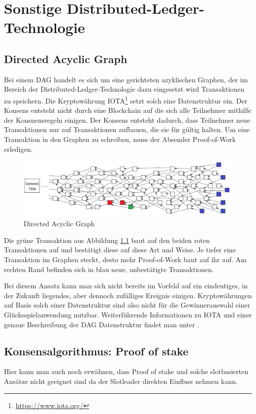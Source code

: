 \chapter{Sonstige Distributed-Ledger-Technologie}
\section{Directed Acyclic Graph}
Bei einem DAG handelt es sich um eine gerichteten azyklischen Graphen, der im Bereich der  Distributed-Ledger-Technologie dazu eingesetzt wird Transaktionen zu speichern.
Die Kryptowährung IOTA\footnote{\url{https://www.iota.org/}} setzt solch eine Datenstruktur ein. Der Konsens entsteht nicht durch eine Blockchain auf die sich alle Teilnehmer mithilfe der Konsnensregeln einigen. Der Konsens entsteht dadurch, dass Teilnehmer neue Transaktionen nur auf Transaktionen aufbauen, die sie für gültig halten. Um eine Transaktion in den Graphen zu schreiben, muss der Absender Proof-of-Work erledigen. 

\begin{figure}[H]
\centering
\includegraphics[width=1\linewidth]{Figures/tangle}
\decoRule
\caption{Directed Acyclic Graph}
\label{fig:tangle}
\end{figure}

Die grüne Transaktion aus Abbildung \ref{fig:tangle} baut auf den beiden roten Transaktionen auf und bestätigt diese auf diese Art und Weise. Je tiefer eine Transaktion im Graphen steckt, desto mehr Proof-of-Work baut auf ihr auf. Am rechten Rand befinden sich in blau neue, unbestätigte Transaktionen.

Bei diesem Ansatz kann man sich nicht bereits im Vorfeld auf ein eindeutiges, in der Zukunft liegendes, aber dennoch zufälliges Ereignis einigen. Kryptowährungen auf Basis solch einer Datenstruktur sind also nicht für die Gewinnerauswahl einer Glücksspielanwendung nutzbar.
Weiterführende Informationen zu IOTA und einer genaue Beschreibung der DAG Datenstruktur findet man unter \citep{tangle_whitepaper}.
\section{Konsensalgorithmus: Proof of stake }\label{pos}
Hier kann man auch noch erwähnen, dass Proof of stake und solche slotbasierten Ansätze nicht geeignet sind da der Slotleader direkten Einfluss nehmen kann.
